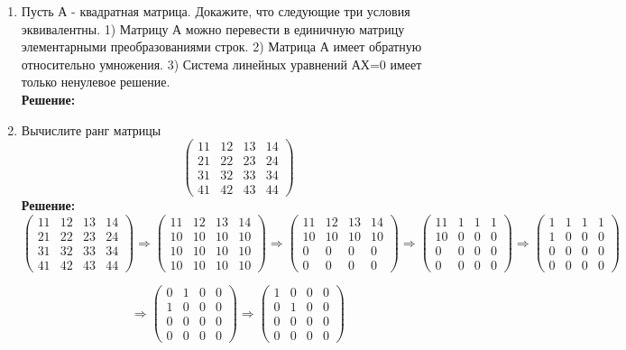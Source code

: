 \documentclass[]{book}
\theoremstyle{definition}
\begin{document}
\begin{enumerate}[resume]
\item Пусть А - квадратная матрица. Докажите, что следующие три условия эквивалентны.
1) Матрицу А можно перевести в единичную матрицу элементарными преобразованиями строк.
2) Матрица А имеет обратную относительно умножения.
3) Система линейных уравнений АХ=0 имеет только ненулевое решение.\\
\textbf{Решение:}


\item Вычислите ранг матрицы
$$ \begin{pmatrix} 
11 & 12 & 13 & 14\\
21 & 22 & 23 & 24 \\
31 & 32 & 33 & 34 \\
41 & 42 & 43 & 44
\end{pmatrix}
$$
\textbf{Решение:}\\
$$ \begin{pmatrix} 
11 & 12 & 13 & 14\\
21 & 22 & 23 & 24 \\
31 & 32 & 33 & 34 \\
41 & 42 & 43 & 44
\end{pmatrix} \Rightarrow
\begin{pmatrix} 
11 & 12 & 13 & 14\\
10 & 10 & 10 & 10 \\
10 & 10 & 10 & 10 \\
10 & 10 & 10 & 10
\end{pmatrix} \Rightarrow
\begin{pmatrix} 
11 & 12 & 13 & 14\\
10 & 10 & 10 & 10\\
0 & 0 & 0 & 0\\
0 & 0 & 0 & 0
\end{pmatrix} \Rightarrow
\begin{pmatrix} 
11 & 1 & 1 & 1\\
10 & 0 & 0 & 0\\
0 & 0 & 0 & 0\\
0 & 0 & 0 & 0
\end{pmatrix} \Rightarrow
\begin{pmatrix} 
1 & 1 & 1 & 1\\
1 & 0 & 0 & 0\\
0 & 0 & 0 & 0\\
0 & 0 & 0 & 0
\end{pmatrix}
$$

$$
\Rightarrow
\begin{pmatrix} 
0 & 1 & 0 & 0\\
1 & 0 & 0 & 0\\
0 & 0 & 0 & 0\\
0 & 0 & 0 & 0
\end{pmatrix}\Rightarrow
\begin{pmatrix} 
1 & 0 & 0 & 0\\
0 & 1 & 0 & 0\\
0 & 0 & 0 & 0\\
0 & 0 & 0 & 0
\end{pmatrix}
$$\\


\end{enumerate}
\end{document}
